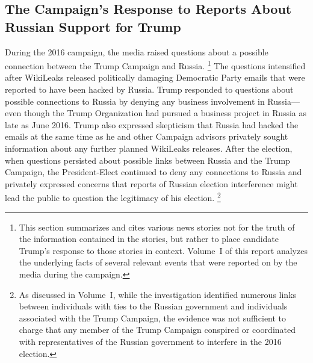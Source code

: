 \subsection{The Campaign's Response to Reports About Russian Support for Trump}
During the 2016 campaign, the media raised questions about a possible connection between the Trump Campaign and Russia.%
\footnote{This section summarizes and cites various news stories not for the truth of the information contained in the stories, but rather to place candidate Trump's response to those stories in context.
Volume~I of this report analyzes the underlying facts of several relevant events that were reported on by the media during the campaign.}
The questions intensified after WikiLeaks released politically damaging Democratic Party emails that were reported to have been hacked by Russia.
Trump responded to questions about possible connections to Russia by denying any business involvement in Russia---even though the Trump Organization had pursued a business project in Russia as late as June 2016.
Trump also expressed skepticism that Russia had hacked the emails at the same time as he and other Campaign advisors privately sought information about any further planned WikiLeaks releases.
After the election, when questions persisted about possible links between Russia and the Trump Campaign, the President-Elect continued to deny any connections to Russia and privately expressed concerns that reports of Russian election interference might lead the public to question the legitimacy of his election.%
\footnote{As discussed in Volume~I, while the investigation identified numerous links between individuals with ties to the Russian government and individuals associated with the Trump Campaign, the evidence was not sufficient to charge that any member of the Trump Campaign conspired or coordinated with representatives of the Russian government to interfere in the 2016 election.}

